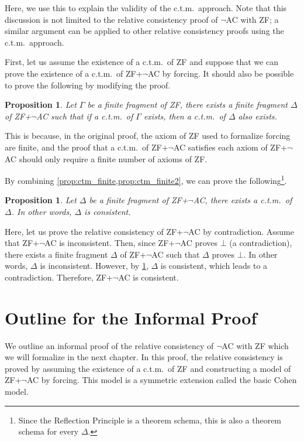 \documentclass{report}
\newtheorem{prop}[thm]{Proposition}
\begin{document}
Here, we use this to explain the validity of the c.t.m.\ approach.
Note that this discussion is not limited to the relative consistency proof of $\neg$AC with ZF;
a similar argument can be applied to other relative consistency proofs using the c.t.m.\ approach.

First, let us assume the existence of a c.t.m.\  of ZF and 
suppose that we can prove the existence of a c.t.m.\ of ZF+$\neg$AC by forcing.
It should also be possible to prove the following by modifying the proof.

\begin{prop}\label{prop:ctm_finite2}
  Let $\Gamma$ be a finite fragment of ZF, 
  there exists a finite fragment $\Delta$ of ZF+$\neg$AC such that
  if a c.t.m.\  of $\Gamma$ exists, then a c.t.m.\  of $\Delta$ also exists.
\end{prop}

This is because, in the original proof, 
the axiom of ZF used to formalize forcing are finite, 
and the proof that a c.t.m.\ of ZF+$\neg$AC satisfies each axiom of ZF+$\neg$AC should 
only require a finite number of axioms of ZF. 

By combining \cref{prop:ctm_finite,prop:ctm_finite2}, 
we can prove the following\footnote{
  Since the Reflection Principle is a theorem schema,
  this is also a theorem schema for every $\Delta$.
}.
\begin{prop} \label{prop:ctm_finite3}
  Let $\Delta$ be a finite fragment of ZF+$\neg$AC,
  there exists a c.t.m.\  of $\Delta$. 
  In other words, $\Delta$ is consistent.
\end{prop}

Here, let us prove the relative consistency of ZF+$\neg$AC by contradiction.
Assume that ZF+$\neg$AC is inconsistent.  
Then, since ZF+$\neg$AC proves $\bot$ (a contradiction),  
there exists a finite fragment $\Delta$ of ZF+$\neg$AC such that $\Delta$ proves $\bot$.  
In other words, $\Delta$ is inconsistent.  
However, by \cref{prop:ctm_finite3}, $\Delta$ is consistent, which leads to a contradiction.
Therefore, ZF+$\neg$AC is consistent.


\section{Outline for the Informal Proof}\label{sec:outline}
We outline an informal proof of the relative consistency of $\neg$AC with ZF which we will formalize in the next chapter.
In this proof, the relative consistency is proved by assuming the existence of a c.t.m.\  of ZF and constructing a model of ZF+$\neg$AC by forcing. 
This model is a symmetric extension called the basic Cohen model.
\end{document}
